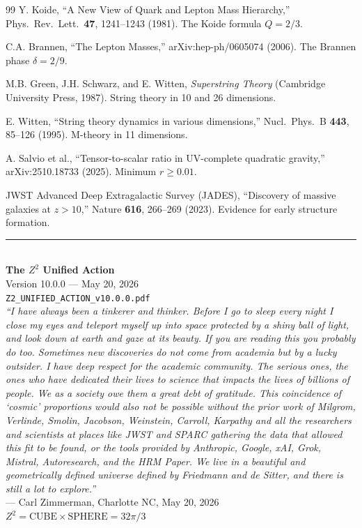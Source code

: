 \documentclass[11pt,a4paper]{article}
\theoremstyle{plain}
\theoremstyle{definition}
\theoremstyle{remark}
\begin{document}
\begin{thebibliography}{99}
 Y. Koide, ``A New View of Quark and Lepton Mass Hierarchy,'' Phys.\ Rev.\ Lett.\ \textbf{47}, 1241--1243 (1981). The Koide formula $Q = 2/3$.

 C.A. Brannen, ``The Lepton Masses,'' arXiv:hep-ph/0605074 (2006). The Brannen phase $\delta = 2/9$.

 M.B. Green, J.H. Schwarz, and E. Witten, \emph{Superstring Theory} (Cambridge University Press, 1987). String theory in 10 and 26 dimensions.

 E. Witten, ``String theory dynamics in various dimensions,'' Nucl.\ Phys.\ B \textbf{443}, 85--126 (1995). M-theory in 11 dimensions.

 A. Salvio et al., ``Tensor-to-scalar ratio in UV-complete quadratic gravity,'' arXiv:2510.18733 (2025). Minimum $r \geq 0.01$.

 JWST Advanced Deep Extragalactic Survey (JADES), ``Discovery of massive galaxies at $z > 10$,'' Nature \textbf{616}, 266--269 (2023). Evidence for early structure formation.

\end{thebibliography}

\vspace{2cm}
\begin{center}
\rule{0.8\textwidth}{0.5pt}\\[0.5cm]
\textbf{The $Z^2$ Unified Action}\\[0.3cm]
Version 10.0.0 --- May 20, 2026\\[0.3cm]
\texttt{Z2\_UNIFIED\_ACTION\_v10.0.0.pdf}\\[0.5cm]

\emph{``I have always been a tinkerer and thinker. Before I go to sleep every night I close my eyes and teleport myself up into space protected by a shiny ball of light, and look down at earth and gaze at its beauty. If you are reading this you probably do too. Sometimes new discoveries do not come from academia but by a lucky outsider. I have deep respect for the academic community. The serious ones, the ones who have dedicated their lives to science that impacts the lives of billions of people. We as a society owe them a great debt of gratitude. This coincidence of `cosmic' proportions would also not be possible without the prior work of Milgrom, Verlinde, Smolin, Jacobson, Weinstein, Carroll, Karpathy and all the researchers and scientists at places like JWST and SPARC gathering the data that allowed this fit to be found, or the tools provided by Anthropic, Google, xAI, Grok, Mistral, Autoresearch, and the HRM Paper. We live in a beautiful and geometrically defined universe defined by Friedmann and de Sitter, and there is still a lot to explore.''}\\[0.3cm]
--- Carl Zimmerman, Charlotte NC, May 20, 2026\\[0.5cm]

\textbf{$Z^2 = \text{CUBE} \times \text{SPHERE} = 32\pi/3$}
\end{center}
\end{document}
